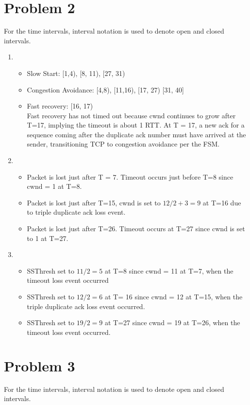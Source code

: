 \documentclass[letter,10pt]{article}
\begin{document}
\section{Problem 2}

For the time intervals, interval notation is used to denote open and closed intervals.

\begin{enumerate} 
	\item 
	\begin{itemize}
		\item Slow Start: [1,4), [8, 11), [27, 31)
		\item Congestion Avoidance: [4,8), [11,16), [17, 27) [31, 40]
		\item Fast recovery: [16, 17) \\
		 Fast recovery has not timed out because cwnd continues to grow after T=17, implying the timeout is about 1 RTT. At T = 17, a new ack for a sequence coming after the duplicate ack number must have arrived at the sender, transitioning TCP to congestion avoidance per the FSM.
	\end{itemize}
		
	\item 
	\begin{itemize}
		\item Packet is lost just after T = 7. Timeout occurs just before T=8 since cwnd = 1 at T=8. 
		\item Packet is lost just after T=15, cwnd is set to $12 / 2 + 3 = 9$ at T=16 due to triple duplicate ack loss event.
		\item Packet is lost just after T=26. Timeout occurs at T=27 since cwnd is set to 1 at T=27. 
	\end{itemize}
	
	
	\item 
	\begin{itemize}
		\item SSThresh set to $11/2 = 5$ at T=8 since cwnd = 11 at T=7, when the timeout loss event occurred
		\item SSThresh set to $12 / 2 = 6$ at T= 16 since cwnd = 12 at T=15, when the triple duplicate ack loss event occurred.
		\item SSThresh set to $19 / 2 = 9$ at T=27 since cwnd = 19 at T=26, when the timeout loss event occurred.
	\end{itemize}
	
\end{enumerate}

\section{Problem 3}
For the time intervals, interval notation is used to denote open and closed intervals.
	
\end{document}
